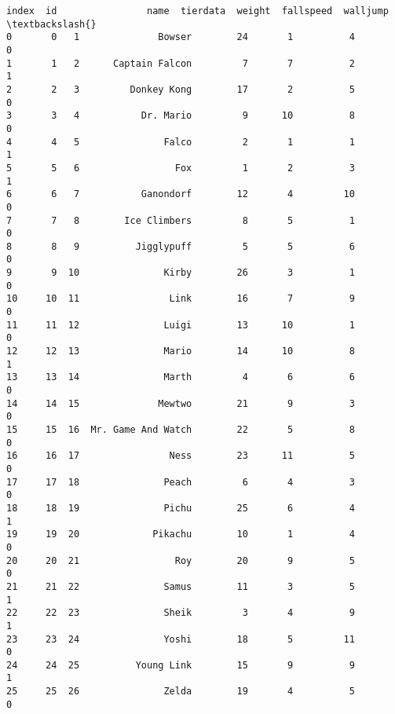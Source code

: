 \documentclass[11pt]{article}
\makeatletter
\newcommand{\boxspacing}{\kern\kvtcb@left@rule\kern\kvtcb@boxsep}
\newcommand{\prompt}[4]{
        \ttfamily\llap{{\color{#2}[#3]:\hspace{3pt}#4}}\vspace{-\baselineskip}
    }
\makeatother
\begin{document}
            \begin{tcolorbox}[breakable, size=fbox, boxrule=.5pt, pad at break*=1mm, opacityfill=0]
\prompt{Out}{outcolor}{12}{\boxspacing}
\begin{Verbatim}[commandchars=\\\{\}]
    index  id                name  tierdata  weight  fallspeed  walljump  \textbackslash{}
0       0   1              Bowser        24       1          4         0
1       1   2      Captain Falcon         7       7          2         1
2       2   3         Donkey Kong        17       2          5         0
3       3   4           Dr. Mario         9      10          8         0
4       4   5               Falco         2       1          1         1
5       5   6                 Fox         1       2          3         1
6       6   7           Ganondorf        12       4         10         0
7       7   8        Ice Climbers         8       5          1         0
8       8   9          Jigglypuff         5       5          6         0
9       9  10               Kirby        26       3          1         0
10     10  11                Link        16       7          9         0
11     11  12               Luigi        13      10          1         0
12     12  13               Mario        14      10          8         1
13     13  14               Marth         4       6          6         0
14     14  15              Mewtwo        21       9          3         0
15     15  16  Mr. Game And Watch        22       5          8         0
16     16  17                Ness        23      11          5         0
17     17  18               Peach         6       4          3         0
18     18  19               Pichu        25       6          4         1
19     19  20             Pikachu        10       1          4         0
20     20  21                 Roy        20       9          5         0
21     21  22               Samus        11       3          5         1
22     22  23               Sheik         3       4          9         1
23     23  24               Yoshi        18       5         11         0
24     24  25          Young Link        15       9          9         1
25     25  26               Zelda        19       4          5         0


\end{Verbatim}
\end{tcolorbox}
\end{document}
